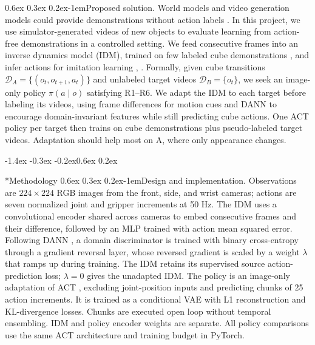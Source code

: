 \documentclass{article}
\makeatletter
\renewcommand{\section}{\@startsection{section}{1}{\z@}%
    {-1.4ex \@plus -0.3ex \@minus -0.2ex}{0.6ex \@plus 0.2ex}{\large\bf\raggedright}}%
\renewcommand{\paragraph}{\@startsection{paragraph}{4}{\z@}%
    {0.6ex \@plus 0.3ex \@minus 0.2ex}{-1em}{\normalsize\bf}}%
\makeatother
\begin{document}
\paragraph{Proposed solution.}
World models and video generation models could provide demonstrations without action
labels \citep{jang2025dreamgen}. In this project, we use simulator-generated videos of
new objects to evaluate learning from action-free demonstrations in a controlled
setting. We feed consecutive frames into an inverse dynamics model (IDM), trained on few
labeled cube demonstrations \citep{morin2026idmssil}, and infer actions for imitation
learning \citep{torabi2018bco}, \citep{baker2022vpt}. Formally, given cube transitions
$\mathcal{D}_A=\{(o_t,o_{t+1},a_t)\}$ and unlabeled target videos
$\mathcal{D}_B=\{o_t\}$, we seek an image-only policy $\pi(a \mid o)$ satisfying R1--R6.
We adapt the IDM to each target before labeling its videos, using frame differences for
motion cues and DANN \citep{ganin2016dann} to encourage domain-invariant features while
still predicting cube actions. One ACT policy per target then trains on cube
demonstrations plus pseudo-labeled target videos. Adaptation should help most on A,
where only appearance changes.

\section*{Methodology}
\paragraph{Design and implementation.}
Observations are $224 \times 224$ RGB images from the front, side, and wrist cameras;
actions are seven normalized joint and gripper increments at 50 Hz. The IDM uses a
convolutional encoder shared across cameras to embed consecutive frames and their
difference, followed by an MLP trained with action mean squared error. Following DANN
\citep{ganin2016dann}, a domain discriminator is trained with binary cross-entropy
through a gradient reversal layer, whose reversed gradient is scaled by a weight
$\lambda$ that ramps up during training. The IDM retains its supervised source
action-prediction loss; $\lambda = 0$ gives the unadapted IDM. The policy is an
image-only adaptation of ACT \citep{zhao2023act}, excluding joint-position inputs and
predicting chunks of 25 action increments. It is trained as a conditional VAE with L1
reconstruction and KL-divergence losses. Chunks are executed open loop without temporal
ensembling. IDM and policy encoder weights are separate. All policy comparisons use the
same ACT architecture and training budget in PyTorch.
\end{document}
